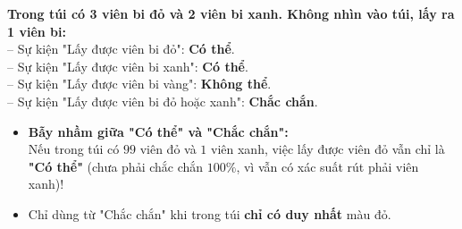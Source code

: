 \documentclass[11pt,a4paper]{article}
\begin{document}
\vspace{-2.5mm}
\noindent
\begin{minipage}[t]{0.49\textwidth}\vspace{0pt}
\begin{tcolorbox}[
  enhanced,
  colback=green!4!white,
  colframe=green!60!black,
  arc=2mm, boxrule=0.8pt,
  left=2mm, right=2mm, top=1.8mm, bottom=1.8mm,
  title={\footnotesize\bfseries\color{white}\faCheckCircle\ Ví dụ thực hành chuẩn mực}
]
{\footnotesize
\textbf{Trong túi có 3 viên bi đỏ và 2 viên bi xanh. Không nhìn vào túi, lấy ra 1 viên bi:}\\
-- Sự kiện "Lấy được viên bi đỏ": \textbf{Có thể}.\\
-- Sự kiện "Lấy được viên bi xanh": \textbf{Có thể}.\\
-- Sự kiện "Lấy được viên bi vàng": \textbf{Không thể}.\\
-- Sự kiện "Lấy được viên bi đỏ hoặc xanh": \textbf{Chắc chắn}.
}
\end{tcolorbox}
\end{minipage}
\hfill
\begin{minipage}[t]{0.49\textwidth}\vspace{0pt}
\begin{tcolorbox}[
  enhanced,
  colback=red!4!white,
  colframe=red!70!black,
  arc=2mm, boxrule=0.8pt,
  left=2mm, right=2mm, top=1.8mm, bottom=1.8mm,
  title={\footnotesize\bfseries\color{white}\faExclamationTriangle\ Mẹo tránh bẫy trắc nghiệm}
]
{\footnotesize
\begin{itemize}\setlength{\itemsep}{1.5pt}\setlength{\leftskip}{-2.5mm}
  \item \textbf{Bẫy nhầm giữa "Có thể" và "Chắc chắn":}\\
  Nếu trong túi có $99$ viên đỏ và $1$ viên xanh, việc lấy được viên đỏ vẫn chỉ là \textbf{"Có thể"} (chưa phải chắc chắn $100\%$, vì vẫn có xác suất rút phải viên xanh)!
  \item Chỉ dùng từ "Chắc chắn" khi trong túi \textbf{chỉ có duy nhất} màu đỏ.
\end{itemize}
}
\end{tcolorbox}
\end{minipage}
\end{document}
